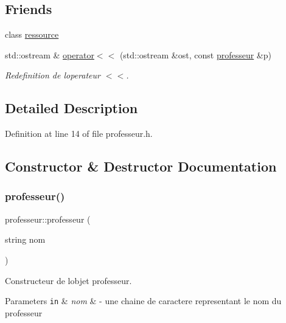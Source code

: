 \subsection*{Friends}
\begin{DoxyCompactItemize}
\item 
class \hyperlink{classprofesseur_a24d55629351652ce27831ce9ef5194c9}{ressource}
\item 
std\+::ostream \& \hyperlink{classprofesseur_af2c9e0cbc90dfc33c6edca8c14d7f1bd}{operator$<$$<$} (std\+::ostream \&ost, const \hyperlink{classprofesseur}{professeur} \&p)
\begin{DoxyCompactList}\small\item\em Redefinition de l\textquotesingle{}operateur $<$$<$. \end{DoxyCompactList}\end{DoxyCompactItemize}


\subsection{Detailed Description}


Definition at line 14 of file professeur.\+h.



\subsection{Constructor \& Destructor Documentation}
\hypertarget{classprofesseur_a3cc95d3ac471e633c318782228a8682e}{}\label{classprofesseur_a3cc95d3ac471e633c318782228a8682e} 
\subsubsection{\texorpdfstring{professeur()}{professeur()}\hspace{0.1cm}{\footnotesize\ttfamily [1/2]}}
{\footnotesize\ttfamily professeur\+::professeur (\begin{DoxyParamCaption}\item[{string}]{nom }\end{DoxyParamCaption})}



Constructeur de l\textquotesingle{}objet professeur. 


\begin{DoxyParams}[1]{Parameters}
\mbox{\tt in}  & {\em nom} & -\/ une chaine de caractere representant le nom du professeur \\
\hline
\end{DoxyParams}


